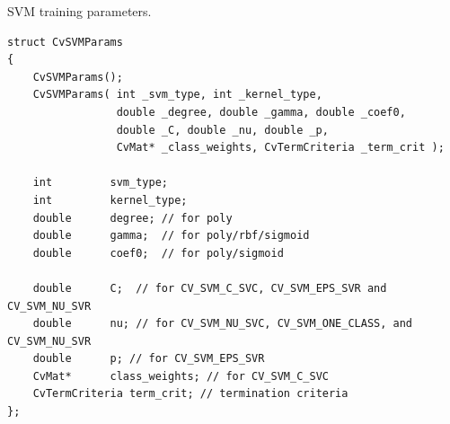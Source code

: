 
SVM training parameters.

\begin{lstlisting}
struct CvSVMParams
{
    CvSVMParams();
    CvSVMParams( int _svm_type, int _kernel_type,
                 double _degree, double _gamma, double _coef0,
                 double _C, double _nu, double _p,
                 CvMat* _class_weights, CvTermCriteria _term_crit );

    int         svm_type;
    int         kernel_type;
    double      degree; // for poly
    double      gamma;  // for poly/rbf/sigmoid
    double      coef0;  // for poly/sigmoid

    double      C;  // for CV_SVM_C_SVC, CV_SVM_EPS_SVR and CV_SVM_NU_SVR
    double      nu; // for CV_SVM_NU_SVC, CV_SVM_ONE_CLASS, and CV_SVM_NU_SVR
    double      p; // for CV_SVM_EPS_SVR
    CvMat*      class_weights; // for CV_SVM_C_SVC
    CvTermCriteria term_crit; // termination criteria
};

\end{lstlisting}

